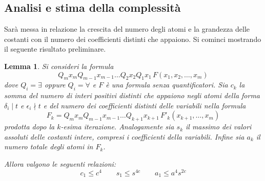 \documentclass[11pt,letterpaper,twoside]{article}
\newtheorem{lemma}{Lemma}
\begin{document}
\subsection{Analisi e stima della complessità}
Sarà messa in relazione la crescita del numero degli atomi e la grandezza delle
costanti con il numero dei coefficienti distinti che appaiono.
Si cominci mostrando il seguente risultato preliminare.

\begin{lemma}
  Si consideri la formula
  $$Q_m x_m Q_{m-1} x_{m-1} \dots Q_2 x_2 Q_1 x_1 \, F(x_1, x_2,
  \dots, x_m)$$
  dove $Q_i = \exists$ oppure $Q_i = \forall$ e $F$ è una
  formula senza quantificatori. 
  Sia $c_k$ la somma del numero di interi positivi distinti che appaiono negli
  atomi della forma $\delta_i \mid t$ e $\epsilon_i \nmid t$ e del numero dei
  coefficienti distinti delle variabili nella formula $$F_k=Q_m x_m Q_{m-1} x_{m-1}
  \dots Q_{k+1} x_{k+1} \, F'_k(x_{k+1}, \dots, x_m)$$ prodotta dopo la $k$-esima
  iterazione.
  Analogamente sia $s_k$ il massimo dei valori assoluti delle costanti intere,
  compresi i coefficienti della variabili.
  Infine sia $a_k$ il numero totale degli atomi in $F_k$.
  
  Allora valgono le seguenti relazioni:
  $$c_1 \le c^4 \qquad s_1 \le s^{4c} \qquad a_1 \le a^4s^{2c}$$

\end{lemma}
\end{document}
